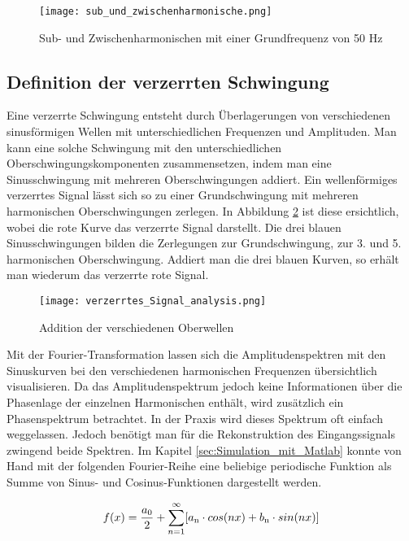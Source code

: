\begin{figure}[ht!]
	\centering
	\texttt{[image: sub\_und\_zwischenharmonische.png]}	
	\caption{Sub- und Zwischenharmonischen mit einer Grundfrequenz von 50 Hz}
	\label{fig:Sub und Zwischenharmonische}
\end{figure}



\subsection{Definition der verzerrten Schwingung}\label{sec:Verzerrte_Schwingung}
Eine verzerrte Schwingung entsteht durch Überlagerungen von verschiedenen sinusförmigen Wellen mit unterschiedlichen Frequenzen und Amplituden. Man kann eine solche Schwingung mit den unterschiedlichen Oberschwingungskomponenten zusammensetzen, indem man eine Sinusschwingung mit mehreren Oberschwingungen addiert. Ein wellenförmiges verzerrtes Signal lässt sich so zu einer Grundschwingung mit mehreren harmonischen Oberschwingungen zerlegen. In Abbildung \ref{fig:Addition Oberwellen} ist diese ersichtlich, wobei die rote Kurve das verzerrte Signal darstellt. Die drei blauen Sinusschwingungen bilden die Zerlegungen zur Grundschwingung, zur 3. und 5. harmonischen Oberschwingung. Addiert man die drei blauen Kurven, so erhält man wiederum das verzerrte rote Signal.

\newpage
\begin{figure}[ht!]
	\centering
	\texttt{[image: verzerrtes\_Signal\_analysis.png]}	
	\caption{Addition der verschiedenen Oberwellen \cite{analysi3}}\label{fig:Addition Oberwellen}
\end{figure}

Mit der Fourier-Transformation lassen sich die Amplitudenspektren mit den Sinuskurven bei den verschiedenen harmonischen Frequenzen übersichtlich visualisieren. Da das Amplitudenspektrum jedoch keine Informationen über die Phasenlage der einzelnen Harmonischen enthält, wird zusätzlich ein Phasenspektrum betrachtet. In der Praxis wird dieses Spektrum oft einfach weggelassen. Jedoch benötigt man für die Rekonstruktion des Eingangssignals zwingend beide Spektren. Im Kapitel \ref{sec:Simulation_mit_Matlab} konnte von Hand mit der folgenden Fourier-Reihe eine beliebige periodische Funktion als Summe von Sinus- und Cosinus-Funktionen dargestellt werden.

\begin{equation}
f(x) = {\frac{a\textsubscript{0}}{2}}+\sum_{n=1}^\infty[a\textsubscript{n} \cdot cos(nx)+b\textsubscript{n} \cdot sin(nx)]
\end{equation}

